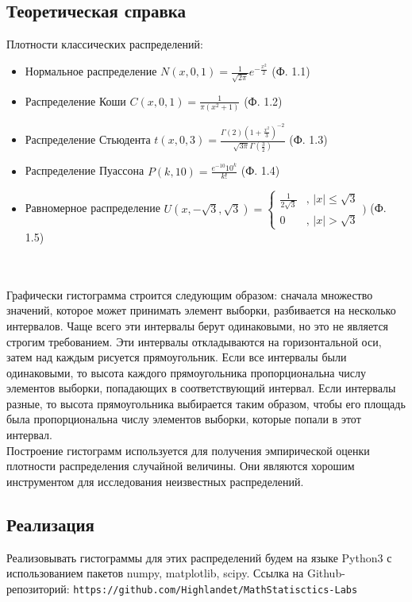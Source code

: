 \documentclass[14pt]{extarticle}
\begin{document}
\subsection{Теоретическая справка}

Плотности классических распределений:
\begin{itemize}
    \item Нормальное распределение \(N(x, 0,1)=\frac{1}{\sqrt{2\pi}}e^{-\frac{x^2}{2}}\) (Ф. 1.1)
    \item Распределение Коши \(C(x,0,1)=\frac{1}{\pi (x^2+1)}\) (Ф. 1.2)
    \item Распределение Стьюдента \(t(x,0,3)=\frac{\Gamma(2)(1+\frac{x^2}{3})^{-2}}{\sqrt{3\pi}\Gamma(\frac{3}{2})}\)
    (Ф. 1.3)
    \item Распределение Пуассона \(P(k, 10)=\frac{e^{-10}10^k}{k!}\) (Ф. 1.4)
    \item Равномерное распределение \(U(x, -\sqrt{3}, \sqrt{3})=\begin{cases}
    \frac{1}{2\sqrt{3}}&\text{, } |x|\leq\sqrt{3} \\
    0&\text{, } |x|>\sqrt{3}
\end{cases})\) (Ф. 1.5)
\end{itemize}\\\\
Графически гистограмма строится следующим образом: сначала множество значений, которое может принимать элемент выборки, разбивается на несколько интервалов. Чаще всего эти интервалы берут одинаковыми, но это не является строгим требованием. Эти интервалы откладываются на горизонтальной оси, затем над каждым рисуется прямоугольник. Если все интервалы были одинаковыми, то высота каждого прямоугольника пропорциональна числу элементов выборки, попадающих в соответствующий интервал. Если интервалы разные, то высота прямоугольника выбирается таким образом, чтобы его площадь была пропорциональна числу элементов выборки, которые попали в этот интервал.\\
Построение гистограмм используется для получения эмпирической оценки плотности распределения случайной величины. Они являются хорошим инструментом для исследования неизвестных распределений.

\subsection{Реализация}

Реализовывать гистограммы для этих распределений будем на языке Python3 с использованием пакетов numpy, matplotlib, scipy.
Ссылка на Github-репозиторий: \texttt{https://github.com/Highlandet/MathStatisctics-Labs}
\end{document}
